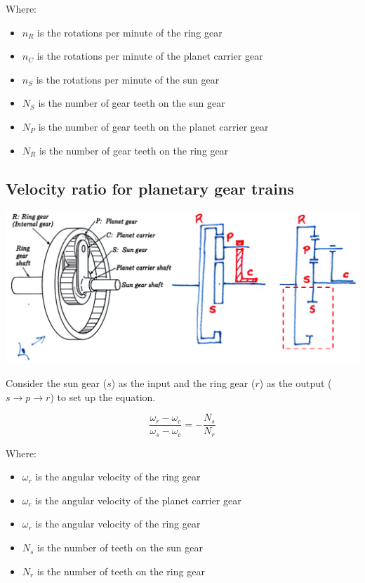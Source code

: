 \documentclass[11pt]{article}
\begin{document}
Where:
\begin{itemize}
\item \(n_R\) is the rotations per minute of the ring gear
\item \(n_C\) is the rotations per minute of the planet carrier gear
\item \(n_S\) is the rotations per minute of the sun gear
\item \(N_S\) is the number of gear teeth on the sun gear
\item \(N_P\) is the number of gear teeth on the planet carrier gear
\item \(N_R\) is the number of gear teeth on the ring gear
\end{itemize}

 \newpage
\subsection{Velocity ratio for planetary gear trains}
\label{sec:org7719faf}
\begin{center}
\includegraphics[width=.9\linewidth]{./images/planetary-gear-train-kinematic-diagram.png}
\end{center}

Consider the sun gear (\(s\)) as the input and the ring gear (\(r\)) as the output (\(s \rightarrow p \rightarrow r\)) to set up the equation.

\[\frac{\omega_r - \omega_c}{\omega_s - \omega_c} = - \frac{N_s}{N_r}\]

Where:
\begin{itemize}
\item \(\omega_r\) is the angular velocity of the ring gear
\item \(\omega_c\) is the angular velocity of the planet carrier gear
\item \(\omega_r\) is the angular velocity of the ring gear
\item \(N_s\) is the number of teeth on the sun gear
\item \(N_r\) is the number of teeth on the ring gear
\end{itemize}
\end{document}
